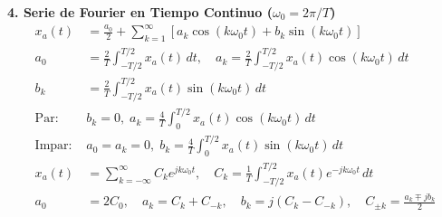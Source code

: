 \documentclass[10pt, a4paper, twocolumn]{article}
\begin{document}
\vspace{2pt}
\textbf{4. Serie de Fourier en Tiempo Continuo ($\omega_0 = 2\pi / T$)}
\begin{align*}
    x_a(t) &= \frac{a_0}{2} + \sum_{k=1}^{\infty} \left[ a_k \cos(k \omega_0 t) + b_k \sin(k \omega_0 t) \right] \\
    a_0 &= \frac{2}{T} \int_{-T/2}^{T/2} x_a(t) \, dt, \quad a_k = \frac{2}{T} \int_{-T/2}^{T/2} x_a(t) \cos(k \omega_0 t) \, dt \\
    b_k &= \frac{2}{T} \int_{-T/2}^{T/2} x_a(t) \sin(k \omega_0 t) \, dt \\
    \text{Par: } & b_k = 0, \; a_k = \frac{4}{T} \int_{0}^{T/2} x_a(t) \cos(k \omega_0 t) \, dt \\
    \text{Impar: } & a_0 = a_k = 0, \; b_k = \frac{4}{T} \int_{0}^{T/2} x_a(t) \sin(k \omega_0 t) \, dt \\
    x_a(t) &= \sum_{k=-\infty}^{\infty} C_k e^{j k \omega_0 t}, \quad C_k = \frac{1}{T} \int_{-T/2}^{T/2} x_a(t) e^{-j k \omega_0 t} \, dt \\
    a_0 &= 2 C_0, \quad a_k = C_k + C_{-k}, \quad b_k = j(C_k - C_{-k}), \quad C_{\pm k} = \frac{a_k \mp j b_k}{2}
\end{align*}
\end{document}
